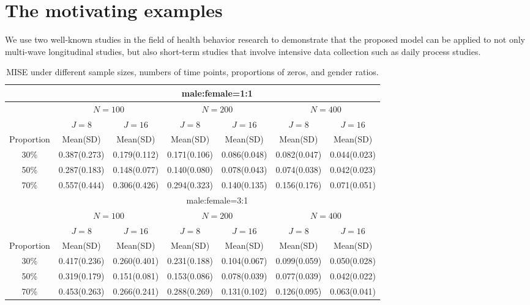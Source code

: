 \section{The motivating examples}

We use two well-known studies in the field of health behavior
research to demonstrate that the proposed model can be applied to
not only multi-wave longitudinal studies, but also short-term
studies that involve intensive data collection such as daily
process studies.



\newpage

\begin{table}[htbp]
\footnotesize
\begin{center}
\caption{MISE under different sample sizes, numbers of time
points, proportions of zeros, and gender ratios.}
\begin{tabular}{c|cc|cc|cc}
\hline 
&\multicolumn{6}{c}{male:female=1:1}\\ \hline
& \multicolumn{2}{c|}{$N=100$}& \multicolumn{2}{c|}{$N=200$}& \multicolumn{2}{c}{$N=400$}\\
\hline
&$J=8$&$J=16$&$J=8$&$J=16$&$J=8$&$J=16$\\
\hline Proportion & Mean(SD) & Mean(SD) & Mean(SD) & Mean(SD) &
Mean(SD) & Mean(SD)\\
 \hline
 30\%&0.387(0.273) &
0.179(0.112)&0.171(0.106) &0.086(0.048) &0.082(0.047) &
0.044(0.023)       \\ 
50\% & 0.287(0.183)        & 0.148(0.077)         &  0.140(0.080)        &   0.078(0.043)       &   0.074(0.038)       & 0.042(0.023)         \\
70\% &  0.557(0.444)       &   0.306(0.426)       &  0.294(0.323)        &  0.140(0.135)        &  0.156(0.176)        & 0.071(0.051)    \\
\hline &\multicolumn{6}{c}{male:female=3:1}\\ \hline
& \multicolumn{2}{c|}{$N=100$}& \multicolumn{2}{c|}{$N=200$}& \multicolumn{2}{c}{$N=400$}\\
\hline
&$J=8$&$J=16$&$J=8$&$J=16$&$J=8$&$J=16$\\
\hline Proportion & Mean(SD) & Mean(SD) & Mean(SD) & Mean(SD) &
Mean(SD) & Mean(SD)\\
 \hline
 30\%&0.417(0.236) &0.260(0.401)&0.231(0.188) &0.104(0.067) &0.099(0.059) &0.050(0.028)       \\
50\% & 0.319(0.179)        & 0.151(0.081)         &  0.153(0.086)        &   0.078(0.039)       &   0.077(0.039)       & 0.042(0.022)         \\
70\% &  0.453(0.263)       &   0.266(0.241)       &  0.288(0.269)        &  0.131(0.102)        &  0.126(0.095)        & 0.063(0.041)    \\
\hline
\end{tabular}
\end{center}
\normalsize
\end{table}





